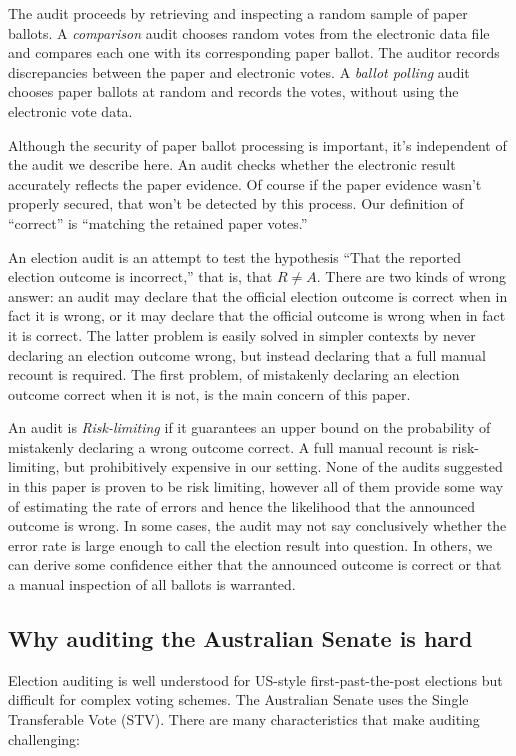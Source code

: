 \documentclass[10pt,a4paper]{article}
\begin{document}
The audit proceeds by retrieving and inspecting a random sample of paper ballots.  A \emph{comparison} audit chooses random votes from the electronic data file and compares each one with its corresponding paper ballot. The auditor records discrepancies between the paper and electronic votes.  A \emph{ballot polling} audit chooses paper ballots at random and records the votes, without using the electronic vote data.  

Although the security of paper ballot processing is important, it's independent of the audit we describe here.  An audit checks whether the electronic result accurately reflects the paper evidence.  Of course if the paper evidence wasn't properly secured, that won't be detected by this process.  Our definition of ``correct'' is ``matching the retained paper votes.''

An election audit is an attempt to test the hypothesis ``That the reported election outcome is incorrect,'' that is, that $R \neq A$.  There are two kinds of wrong answer: an audit may declare that the official election outcome is correct when in fact it is wrong, or it may declare that the official outcome is wrong when in fact it is correct.  The latter problem is easily solved in simpler contexts by never declaring an election outcome wrong, but instead declaring that a full manual recount is required.  The first problem, of mistakenly declaring an election outcome correct when it is not, is the main concern of this paper.

An audit is \emph{Risk-limiting} \cite{lindemanStark12} if it guarantees an upper bound on the probability of mistakenly declaring a wrong outcome correct.  A full manual recount is risk-limiting, but prohibitively expensive in our setting.  None of the audits suggested in this paper is proven to be risk limiting, however all of them provide some way of estimating the rate of errors and hence the likelihood that the announced outcome is wrong.  In some cases, the audit may not say conclusively whether the error rate is large enough to call the election result into question.  In others, we can derive some confidence either that the announced outcome is correct or that a manual inspection of all ballots is warranted.


\subsection{Why auditing the Australian Senate is hard}

Election auditing is well understood for US-style first-past-the-post elections but difficult for complex voting schemes.  The Australian Senate uses the Single Transferable Vote (STV).  
There are many characteristics that make auditing challenging:
\end{document}
